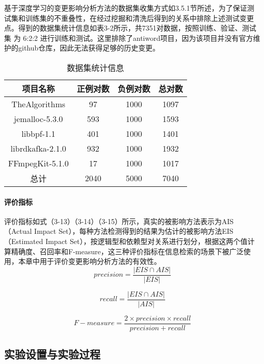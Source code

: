 基于深度学习的变更影响分析方法的数据集收集方式如3.5.1节所述，为了保证测试集和训练集的不重叠性，在经过挖掘和清洗后得到的关系中排除上述测试变更点。得到的数据集统计信息如表3-2所示，共7351对数据，按照训练、验证、测试集 为 6:2:2 进行训练和测试。这里排除了antiword项目，因为该项目并没有官方维护的github仓库，因此无法获得足够的历史变更。

\begin{table}[htbp]
\caption{数据集统计信息}
\vspace{0.5em}\centering\wuhao
\begin{tabular}{cccc}
\toprule
项目名称 & 正例对数 & 负例对数 & 总对数 \\
\midrule
TheAlgorithms & 97 & 1000 & 1097 \\
jemalloc-5.3.0 & 593 & 1000 & 1593 \\
libbpf-1.1 & 401 & 1000 & 1401 \\
librdkafka-2.1.0 & 932  & 1000 & 1932 \\
FFmpegKit-5.1.0 & 17 & 1000 & 1017 \\ 
总计 & 2040 & 5000 & 7040 \\
\bottomrule
\end{tabular}
\end{table}

\paragraph{评价指标}

评价指标如式（3-13）（3-14）（3-15）所示，真实的被影响方法表示为AIS（Actual Impact Set），每种方法检测得到的结果为估计的被影响方法EIS（Estimated Impact Set），按逻辑型和依赖型对关系进行划分，根据这两个值计算精确度、召回率和F-measure，这三种评价指标在信息检索的场景下被广泛使用，本章中用于评价变更影响分析方法的有效性。
\begin{equation}
{precision} = \frac{|EIS \cap AIS|}{|EIS|}
\end{equation}

\begin{equation}
{recall} = \frac{|EIS \cap AIS|}{|AIS|}
\end{equation}

\begin{equation}
F-measure = \frac{2 \times precision \times recall}{precision + recall}
\end{equation}

\subsection{实验设置与实验过程}


